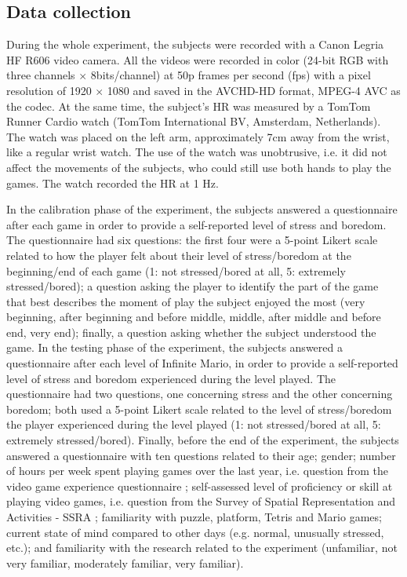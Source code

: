 \subsection{Data collection}

During the whole experiment, the subjects were recorded with a Canon Legria HF R606 video camera. All the videos were recorded in color (24-bit RGB with three channels $\times$ 8bits/channel) at 50p frames per second (fps) with a pixel resolution of 1920 $\times$ 1080 and saved in the AVCHD-HD format, MPEG-4 AVC as the codec. At the same time, the subject's HR was measured by a TomTom Runner Cardio watch (TomTom International BV, Amsterdam, Netherlands). The watch was placed on the left arm, approximately 7cm away from the wrist, like a regular wrist watch. The use of the watch was unobtrusive, i.e. it did not affect the movements of the subjects, who could still use both hands to play the games. The watch recorded the HR at 1 Hz.

In the calibration phase of the experiment, the subjects answered a questionnaire after each game in order to provide a self-reported level of stress and boredom. The questionnaire had six questions: the first four were a 5-point Likert scale related to how the player felt about their level of stress/boredom at the beginning/end of each game (1: not stressed/bored at all, 5: extremely stressed/bored); a question asking the player to identify the part of the game that best describes the moment of play the subject enjoyed the most (very beginning, after beginning and before middle, middle, after middle and before end, very end); finally, a question asking whether the subject understood the game. In the testing phase of the experiment, the subjects answered a questionnaire after each level of Infinite Mario, in order to provide a self-reported level of stress and boredom experienced during the level played. The questionnaire had two questions, one concerning stress and the other concerning boredom; both used a 5-point Likert scale related to the level of stress/boredom the player experienced during the level played (1: not stressed/bored at all, 5: extremely stressed/bored). Finally, before the end of the experiment, the subjects answered a questionnaire with ten questions related to their age; gender; number of hours per week spent playing games over the last year, i.e. question from the video game experience questionnaire \parencite{unsworth2015playing}; self-assessed level of proficiency or skill at playing video games, i.e. question from the Survey of Spatial Representation and Activities - SSRA \parencite{terlecki2005important}; familiarity with puzzle, platform, Tetris and Mario games; current state of mind compared to other days (e.g. normal, unusually stressed, etc.); and familiarity with the research related to the experiment (unfamiliar, not very familiar, moderately familiar, very familiar).

